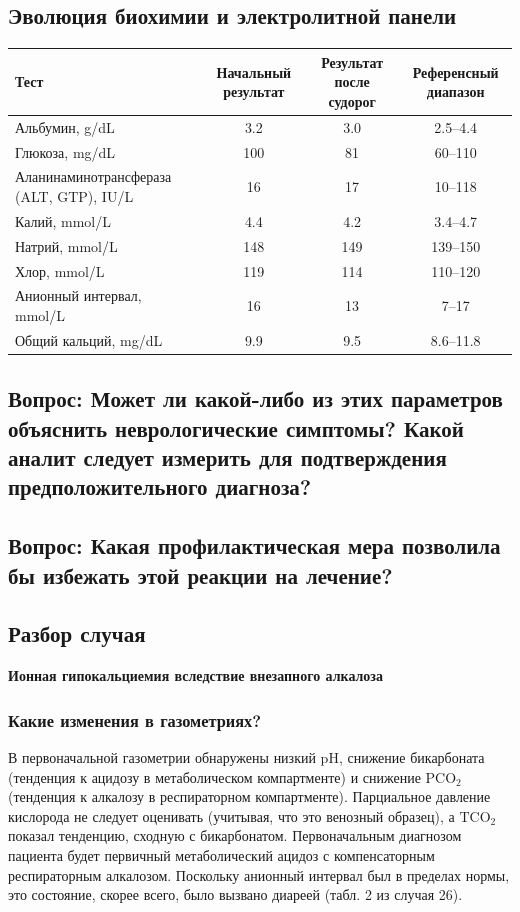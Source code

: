 \documentclass[a4paper,12pt]{book}
\begin{document}
\subsection*{Эволюция биохимии и электролитной панели}
\begin{tabular}{lccc}
\toprule
Тест & Начальный результат & Результат после судорог & Референсный диапазон \\
\midrule
Альбумин, g/dL & 3.2 & 3.0 & 2.5--4.4 \\
Глюкоза, mg/dL & 100 & 81 & 60--110 \\
Аланинаминотрансфераза (ALT, GTP), IU/L & 16 & 17 & 10--118 \\
Калий, mmol/L & 4.4 & 4.2 & 3.4--4.7 \\
Натрий, mmol/L & 148 & 149 & 139--150 \\
Хлор, mmol/L & 119 & 114 & 110--120 \\
Анионный интервал, mmol/L & 16 & 13 & 7--17 \\
Общий кальций, mg/dL & 9.9 & 9.5 & 8.6--11.8 \\
\bottomrule
\end{tabular}

\subsection*{Вопрос: Может ли какой-либо из этих параметров объяснить неврологические симптомы? Какой аналит следует измерить для подтверждения предположительного диагноза?}
\subsection*{Вопрос: Какая профилактическая мера позволила бы избежать этой реакции на лечение?}

\subsection*{Разбор случая}
\textbf{Ионная гипокальциемия вследствие внезапного алкалоза}

\subsubsection*{Какие изменения в газометриях?}
В первоначальной газометрии обнаружены низкий pH, снижение бикарбоната (тенденция к ацидозу в метаболическом компартменте) и снижение $\mathrm{PCO_2}$ (тенденция к алкалозу в респираторном компартменте). Парциальное давление кислорода не следует оценивать (учитывая, что это венозный образец), а $\mathrm{TCO_2}$ показал тенденцию, сходную с бикарбонатом. Первоначальным диагнозом пациента будет первичный метаболический ацидоз с компенсаторным респираторным алкалозом. Поскольку анионный интервал был в пределах нормы, это состояние, скорее всего, было вызвано диареей (табл. 2 из случая 26).
\end{document}
